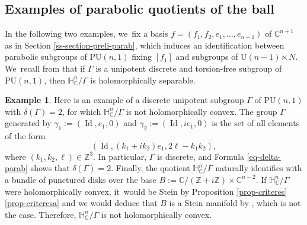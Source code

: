 \documentclass[JEP,XML,SOM,Unicode,NoEqCountersInSection,published]{cedram}
\theoremstyle{definition}
\newtheorem*{example}{Example}
\newcommand{\C}{\mathbb{C}}
\newcommand{\Z}{\mathbb{Z}}
\newcommand{\HNC}{\mathbb{H}^{n}_{\C}}
\newcommand{\PU}{\mathrm{PU}}
\DeclareMathOperator{\Id}{Id}
\def\C{\mathbb{C}}
\newcommand{\HNC}{\mathbb{H}^{n}_{\C}}
\newcommand{\PU}{\mathrm{PU}}
\begin{document}
\subsection{Examples of parabolic quotients of the ball}
In the following two examples, we~fix a basis $f=(f_1,f_2,e_1,\dots,e_{n-1})$ of $\C^{n+1}$ as in Section \ref{ss-section-preli-parab}, which induces an identification between parabolic subgroups of $\PU(n,1)$ fixing $[f_1]$ and subgroups of $\mathrm{U}(n-1)\ltimes N$. We~recall from \cite[Prop.\,1.1]{miebachQuotientsBoundedHomogeneous2024} that if $\Gamma$ is a unipotent discrete and torsion-free subgroup of $\PU(n,1)$, then $\HNC/\Gamma$ is holomorphically separable.

\begin{example}Here is an example of a discrete unipotent subgroup $\Gamma$ of $\PU(n,1)$ with $\delta(\Gamma)=2$, for which $\HNC/\Gamma$ is not holomorphically convex. The group $\Gamma$ generated by $\gamma_1:=(\Id,e_1,0)$ and $\gamma_2:=(\Id, ie_1,0)$ is the set of all elements of the form
\begin{equation*}
(\Id,(k_1+ik_2)e_1,2\ell-k_1k_2),
\end{equation*}
where $(k_1,k_2,\ell)\!\in\! \Z^3$. In particular, $\Gamma$ is discrete, and Formula \eqref{eq-delta-parab} shows that \hbox{$\delta(\Gamma)\!=\!2$}. Finally, the quotient $\HNC/\Gamma$ naturally identifies with a bundle of punctured disks over the base $B:=\C/(\Z+i\Z) \times \C^{n-2}$. If $\HNC/\Gamma$ were holomorphically convex, it~would be Stein by Proposition \ref{prop-criteres}\eqref{prop-criteresa} and we would deduce that $B$ is a Stein manifold by \cite[Lem.\,1.6]{coltoiuOpenSetsStein1997}, which is not the case. Therefore, $\HNC/\Gamma$ is not holomorphically convex.
\end{example}
\end{document}
